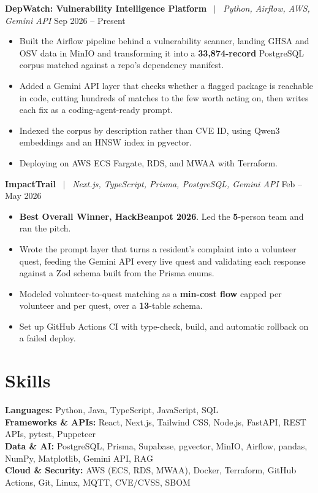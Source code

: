 \documentclass[letterpaper,10pt]{article}
\newcommand{\entrysize}{\fontsize{10.5}{12}\selectfont}
\newif\ifentrygap
\newcommand{\entrygapsize}{6pt}
\newcommand{\entryfirstgap}{0.4pt}
\newcommand{\entrysep}{\ifentrygap\vspace{\entrygapsize}\else\vspace{\entryfirstgap}\fi\global\entrygaptrue}
\let\entryorigsection\section
\renewcommand{\section}{\global\entrygapfalse\entryorigsection}
\newcommand{\project}[3]{\entrysep{\entrysize\textbf{#1}} \ $\vert$ \ \textit{#2} \hfill #3}
\begin{document}
\project{DepWatch: Vulnerability Intelligence Platform}{Python, Airflow, AWS, Gemini API}{Sep 2026 -- Present}
\begin{itemize}
  \item Built the Airflow pipeline behind a vulnerability scanner, landing GHSA and OSV data in MinIO and
        transforming it into a \textbf{33,874-record} PostgreSQL corpus matched against a repo's dependency manifest.
  \item Added a Gemini API layer that checks whether a flagged package is reachable in code, cutting hundreds of
        matches to the few worth acting on, then writes each fix as a coding-agent-ready prompt.
  \item Indexed the corpus by description rather than CVE ID, using Qwen3 embeddings and an HNSW index in pgvector.
  \item Deploying on AWS ECS Fargate, RDS, and MWAA with Terraform.
\end{itemize}

\project{ImpactTrail}{Next.js, TypeScript, Prisma, PostgreSQL, Gemini API}{Feb -- May 2026}
\begin{itemize}
  \item \textbf{Best Overall Winner, HackBeanpot 2026}. Led the \textbf{5}-person team and ran the pitch.
  \item Wrote the prompt layer that turns a resident's complaint into a volunteer quest, feeding the Gemini API every live
        quest and validating each response against a Zod schema built from the Prisma enums.
  \item Modeled volunteer-to-quest matching as a \textbf{min-cost flow} capped per volunteer and per quest, over a \textbf{13}-table schema.
  \item Set up GitHub Actions CI with type-check, build, and automatic rollback on a failed deploy.
\end{itemize}

\section{Skills}

\textbf{Languages:} Python, Java, TypeScript, JavaScript, SQL \\
\textbf{Frameworks \& APIs:} React, Next.js, Tailwind CSS, Node.js, FastAPI, REST APIs, pytest, Puppeteer \\
\textbf{Data \& AI:} PostgreSQL, Prisma, Supabase, pgvector, MinIO, Airflow, pandas, NumPy, Matplotlib, Gemini API, RAG \\
\textbf{Cloud \& Security:} AWS (ECS, RDS, MWAA), Docker, Terraform, GitHub Actions, Git, Linux, MQTT, CVE/CVSS, SBOM
\end{document}

